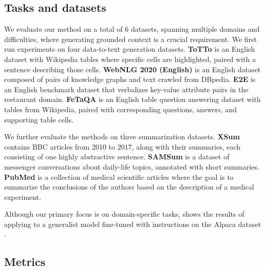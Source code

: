 \subsection{Tasks and datasets}
We evaluate our method \scope on a total of 6 datasets, spanning multiple domains and difficulties, where generating grounded context is a crucial requirement. We first run experiments on four data-to-text generation datasets.
\textbf{ToTTo} \citep{totto} is an English dataset with Wikipedia tables where specific cells are highlighted, paired with a sentence describing those cells.
\textbf{WebNLG 2020 (English)} \citep{webnlg2020} is an English dataset composed of pairs of knowledge graphs and text crawled from DBpedia. 
\textbf{E2E} \citep{e2e_cleaned} is an English benchmark dataset that verbalizes key-value attribute pairs in the restaurant domain. 
\textbf{FeTaQA} \citep{fetaqa} is an English table question answering dataset with tables from Wikipedia, paired with corresponding questions, answers, and supporting table cells.

We further evaluate the methods on three summarization datasets.
\textbf{XSum} \citep{xsum} contains BBC articles from 2010 to 2017, along with their summaries, each consisting of one highly abstractive sentence.
\textbf{SAMSum} \citep{samsum} is a dataset of messenger conversations about daily-life topics, annotated with short summaries.
\textbf{PubMed} \citep{summ-medical} is a collection of medical scientific articles where the goal is to summarize the conclusions of the authors based on the description of a medical experiment.

Although our primary focus is on domain-specific tasks,  shows the results of applying \scope to a generalist model fine-tuned with instructions on the Alpaca dataset \citep{alpaca}.

\subsection{Metrics}


